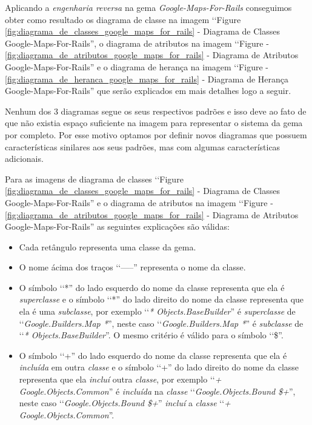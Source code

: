 Aplicando a \emph{engenharia reversa} na gema \emph{Google-Maps-For-Rails} conseguimos obter como resultado
os diagrama de classe na imagem ‘‘Figure \ref{fig:diagrama_de_classes_google_maps_for_rails} - Diagrama de 
Classes Google-Maps-For-Rails'', o diagrama de atributos na imagem ‘‘Figure - 
\ref{fig:diagrama_de_atributos_google_maps_for_rails} - Diagrama de Atributos Google-Maps-For-Rails'' e o 
diagrama de herança na imagem ‘‘Figure - \ref{fig:diagrama_de_heranca_google_maps_for_rails} - Diagrama de 
Herança Google-Maps-For-Rails'' que serão explicados em mais detalhes logo a seguir.

Nenhum dos 3 diagramas segue os seus respectivos padrões e isso deve ao fato de que não existia espaço 
suficiente na imagem para representar o sistema da gema por completo. Por esse motivo optamos por definir 
novos diagramas que possuem características sinilares aos seus padrões, mas com algumas características
adicionais.

Para as imagens de diagrama de classes ‘‘Figure \ref{fig:diagrama_de_classes_google_maps_for_rails} - 
Diagrama de Classes Google-Maps-For-Rails'' e o diagrama de atributos na imagem ‘‘Figure - 
\ref{fig:diagrama_de_atributos_google_maps_for_rails} - Diagrama de Atributos Google-Maps-For-Rails''
as seguintes explicações são válidas:

\begin{itemize}

 \item Cada retângulo representa uma classe da gema.
 
 \item O nome ácima dos traços ‘‘-----'' representa o nome da classe.
 
 \item O símbolo ‘‘*'' do lado esquerdo do nome da classe representa que ela é \emph{superclasse} e o 
 símbolo ‘‘*'' do lado direito do nome da classe representa que ela é uma \emph{subclasse}, por exemplo
 ‘‘\emph{* Objects.BaseBuilder}'' é \emph{superclasse} de ‘‘\emph{Google.Builders.Map *}'', neste caso 
 ‘‘\emph{Google.Builders.Map *}'' é \emph{subclasse} de ‘‘\emph{* Objects.BaseBuilder}''. O mesmo 
 critério é válido para o símbolo ‘‘\$''.
 
 \item O símbolo ‘‘+'' do lado esquerdo do nome da classe representa que ela é \emph{incluída} em outra  
 \emph{classe} e o símbolo ‘‘+'' do lado direito do nome da classe representa que ela \emph{incluí} outra 
 \emph{classe}, por exemplo ‘‘\emph{+ Google.Objects.Common}'' é \emph{incluída} na \emph{classe} 
 ‘‘\emph{Google.Objects.Bound \$+}'', neste caso ‘‘\emph{Google.Objects.Bound \$+}'' \emph{incluí} a 
 \emph{classe} ‘‘\emph{+ Google.Objects.Common}''.
 
\end{itemize}

